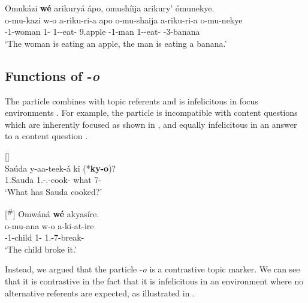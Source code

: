 \documentclass[output=paper]{langscibook}
\begin{document}
\ex
Omukázi \textbf{wé} arikuryá ápo, omushíija arikury’ ómunekye.\\
\gll
  o-mu-kazi  w-o  a-riku-ri-a  apo  o-mu-shaija  a-riku-ri-a    o-mu-nekye\\
\AUG{}-{}1-woman  1-\CM{}  1\SM{}-\IPFV{}-{}eat-\FV{}  9.apple  \AUG{}-{}1-man  1\SM{}-\IPFV{}-{}eat-\FV{}  \AUG{}-{}3-banana\\
\glt
  \glt ‘The woman is eating an apple, the man is eating a banana.’\\

\z
\z

\subsection{Functions of -\textit{o}}
\label{bkm:Ref135664287}
The particle combines with topic referents and is infelicitous in focus environments \citep{AsiimwevanderWal2021}. For example, the particle is incompatible with content questions which are inherently focused as shown in , and equally infelicitous in an answer to a content question .

\ea
[]{
\label{bkm:Ref113716034}
\citep[7]{AsiimwevanderWal2021}\\
\gll
Saúda  y-aa-teek-á  ki  (*\textbf{ky-o})?\\
1.Sauda  1\SM{}.\SG{}-\N{}.\PST{}-{}cook-\FV{}  what  {\db}7-\CM{}\\
\glt
‘What has Sauda cooked?’\\
}


\sn
[\textsuperscript{\#}]{
Omwáná \textbf{wé} akyasíre.\\
\gll
o-mu-ana  w-o  a-ki-at-ire\\
\AUG{}-{}1-child  1-\CM{}  1\SM{}.\SG{}-7\OM{}-{}break-\PFV{}\\
\glt
`The child broke it.’\\
}

\z

Instead, we argued that the particle -\textit{o} is a contrastive topic marker. We can see that it is contrastive in the fact that it is infelicitous in an environment where no alternative referents are expected, as illustrated in .
\end{document}

